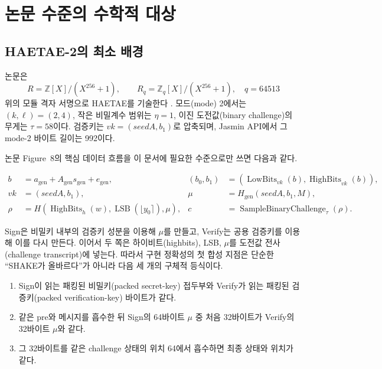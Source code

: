 \section{논문 수준의 수학적 대상}
\label{sec:math-target}

\subsection{HAETAE-2의 최소 배경}

논문은
\[
  R=\mathbb{Z}[X]/(X^{256}+1),\qquad
  R_q=\mathbb{Z}_q[X]/(X^{256}+1),\quad q=64513
\]
위의 모듈 격자 서명으로 HAETAE를 기술한다 \cite{haetae-spec}. 모드(mode) 2에서는
\((k,\ell)=(2,4)\), 작은 비밀계수 범위는 \(\eta=1\), 이진 도전값(binary challenge)의
무게는 \(\tau=58\)이다. 검증키는 \(vk=(\mathit{seedA},b_1)\)로 압축되며,
Jasmin API에서 그 mode-2 바이트 길이는 992이다.

논문 Figure~8의 핵심 데이터 흐름을 이 문서에 필요한 수준으로만 쓰면 다음과
같다.

\begin{align*}
  b &= a_{\mathrm{gen}}+A_{\mathrm{gen}}s_{\mathrm{gen}}+e_{\mathrm{gen}},
  & (b_0,b_1)&=(\operatorname{LowBits}_{vk}(b),
                    \operatorname{HighBits}_{vk}(b)),\\
  vk&=(\mathit{seedA},b_1),
  & \mu&=H_{\mathrm{gen}}(\mathit{seedA},b_1,M),\\
  \rho&=H(\operatorname{HighBits}_h(w),
          \operatorname{LSB}(\lfloor y_0\rceil),\mu),
  & c&=\operatorname{SampleBinaryChallenge}_{\tau}(\rho).
\end{align*}

Sign은 비밀키 내부의 검증키 성분을 이용해 \(\mu\)를 만들고, Verify는 공용
검증키를 이용해 이를 다시 만든다. 이어서 두 쪽은 하이비트(highbits), LSB,
\(\mu\)를 도전값 전사(challenge transcript)에 넣는다. 따라서 구현 정확성의
첫 합성 지점은 단순한
``SHAKE가 올바르다''가 아니라 다음 세 개의 구체적 등식이다.

\begin{enumerate}
  \item Sign이 읽는 패킹된 비밀키(packed secret-key) 접두부와 Verify가 읽는
        패킹된 검증키(packed verification-key) 바이트가 같다.
  \item 같은 pre와 메시지를 흡수한 뒤 Sign의 64바이트 \(\mu\) 중 처음
        32바이트가 Verify의 32바이트 \(\mu\)와 같다.
  \item 그 32바이트를 같은 challenge 상태의 위치 64에서 흡수하면 최종
        상태와 위치가 같다.
\end{enumerate}

